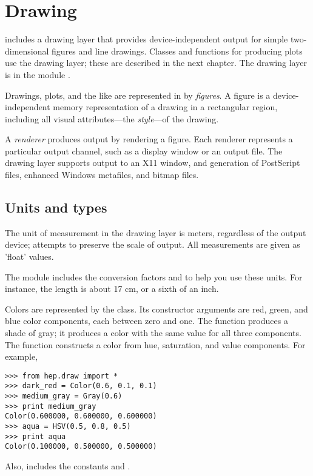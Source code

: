 \chapter{Drawing}

\pyhep includes a drawing layer that provides device-independent output
for simple two-dimensional figures and line drawings.  Classes and
functions for producing plots use the drawing layer; these are described
in the next chapter.  The drawing layer is in the module
.

Drawings, plots, and the like are represented in \pyhep by
\textit{figures}.  A figure is a device-independent memory
representation of a drawing in a rectangular region, including all
visual attributes---the \textit{style}---of the drawing.  

A \textit{renderer} produces output by rendering a figure.  Each
renderer represents a particular output channel, such as a display
window or an output file.  The drawing layer supports output to an X11
window, and generation of PostScript files, enhanced Windows metafiles,
and bitmap files.


\section{Units and types}

The unit of measurement in the \pyhep drawing layer is meters,
regardless of the output device; \pyhep attempts to preserve the scale
of output.  All measurements are given as 'float' values.

The module  includes the conversion factors
 and  to help you use these units.  For instance,
the length  is about 17 cm, or a sixth of an inch.

Colors are represented by the  class.  Its constructor
arguments are red, green, and blue color components, each between zero
and one.  The function  produces a shade of gray; it
produces a color with the same value for all three components.  The
function  constructs a color from hue, saturation, and
value components.  For example,
\begin{verbatim}
>>> from hep.draw import *
>>> dark_red = Color(0.6, 0.1, 0.1)
>>> medium_gray = Gray(0.6)
>>> print medium_gray
Color(0.600000, 0.600000, 0.600000)
>>> aqua = HSV(0.5, 0.8, 0.5)
>>> print aqua
Color(0.100000, 0.500000, 0.500000)
\end{verbatim}
Also,  includes the constants  and
.

